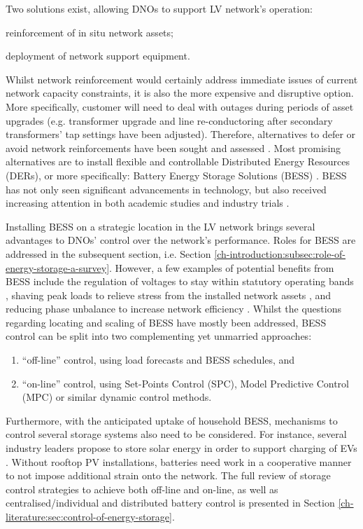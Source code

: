 Two solutions exist, allowing DNOs to support LV network's operation: 
\begin{enumerate*}
	\item reinforcement of in situ network assets;
	\item deployment of network support equipment.
\end{enumerate*}
Whilst network reinforcement would certainly address immediate issues of current network capacity constraints, it is also the more expensive and disruptive option.
More specifically, customer will need to deal with outages during periods of asset upgrades (e.g. transformer upgrade and line re-conductoring after secondary transformers' tap settings have been adjusted).
Therefore, alternatives to defer or avoid network reinforcements have been sought and assessed \cite{Harrison2007, Zangs2016a, VanderKlauw2016d, Greenwood2017}.
Most promising alternatives are to install flexible and controllable Distributed Energy Resources (DERs), or more specifically: Battery Energy Storage Solutions (BESS) \cite{Wade2010}.
BESS has not only seen significant advancements in technology, but also received increasing attention in both academic studies and industry trials \cite{Palizban2016}.

Installing BESS on a strategic location in the LV network brings several advantages to DNOs' control over the network's performance.
Roles for BESS are addressed in the subsequent section, i.e. Section \ref{ch-introduction:subsec:role-of-energy-storage-a-survey}.
However, a few examples of potential benefits from BESS include the regulation of voltages to stay within statutory operating bands \cite{Yang2014}, shaving peak loads to relieve stress from the installed network assets \cite{Bennett2015}, and reducing phase unbalance to increase network efficiency \cite{Wang2015b} .
Whilst the questions regarding locating and scaling of BESS have mostly been addressed, BESS control can be split into two complementing yet unmarried approaches:

\begin{enumerate}
	\item ``off-line'' control, using load forecasts and BESS schedules, and
	\item ``on-line'' control, using Set-Points Control (SPC), Model Predictive Control (MPC) or similar dynamic control methods.
\end{enumerate}

Furthermore, with the anticipated uptake of household BESS, mechanisms to control several storage systems also need to be considered.
For instance, several industry leaders propose to store solar energy in order to support charging of EVs \cite{Baumann2017}.
Without rooftop PV installations, batteries need work in a cooperative manner to not impose additional strain onto the network.
The full review of storage control strategies to achieve both off-line and on-line, as well as centralised/individual and distributed battery control is presented in Section \ref{ch-literature:sec:control-of-energy-storage}.

